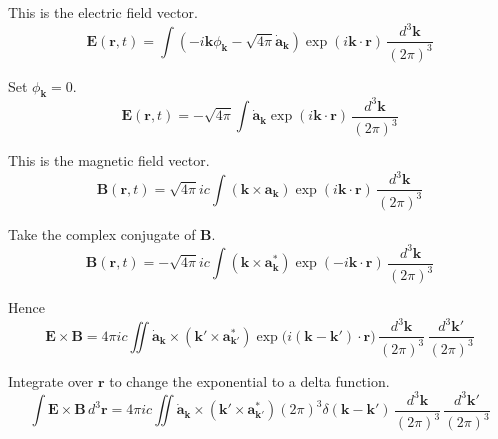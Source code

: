 


This is the electric field vector.
\begin{equation*}
\mathbf E(\mathbf r,t)
=\int\left(-i\mathbf k\phi_{\mathbf k}-\sqrt{4\pi}\dot{\mathbf a}_{\mathbf k}\right)
\exp(i\mathbf k\cdot\mathbf r)\,
\frac{d^3\mathbf k}{(2\pi)^3}
\end{equation*}

Set $\phi_{\mathbf k}=0$.
\begin{equation*}
\mathbf E(\mathbf r,t)
=-\sqrt{4\pi}\int\dot{\mathbf a}_{\mathbf k}
\exp(i\mathbf k\cdot\mathbf r)\,
\frac{d^3\mathbf k}{(2\pi)^3}
\end{equation*}

This is the magnetic field vector.
\begin{equation*}
\mathbf B(\mathbf r,t)
=\sqrt{4\pi}ic\int(\mathbf k\times\mathbf a_{\mathbf k})
\exp(i\mathbf k\cdot\mathbf r)\,
\frac{d^3\mathbf k}{(2\pi)^3}
\end{equation*}

Take the complex conjugate of $\mathbf B$.
\begin{equation*}
\mathbf B(\mathbf r,t)
=-\sqrt{4\pi}ic\int(\mathbf k\times\mathbf a_{\mathbf k}^*)
\exp(-i\mathbf k\cdot\mathbf r)\,
\frac{d^3\mathbf k}{(2\pi)^3}
\end{equation*}

Hence
\begin{equation*}
\mathbf E\times\mathbf B
=4\pi ic\iint\dot{\mathbf a}_{\mathbf k}\times(\mathbf k'\times\mathbf a_{\mathbf k'}^*)
\exp\bigl(i(\mathbf k-\mathbf k')\cdot\mathbf r\bigr)
\,\frac{d^3\mathbf k}{(2\pi)^3}\,\frac{d^3\mathbf k'}{(2\pi)^3}
\end{equation*}

Integrate over $\mathbf r$ to change the exponential to a delta function.
\begin{equation*}
\int\mathbf E\times\mathbf B\,d^3\mathbf r
=4\pi ic\iint\dot{\mathbf a}_{\mathbf k}\times(\mathbf k'\times\mathbf a_{\mathbf k'}^*)
(2\pi)^3\delta(\mathbf k-\mathbf k')
\,\frac{d^3\mathbf k}{(2\pi)^3}\,\frac{d^3\mathbf k'}{(2\pi)^3}
\end{equation*}

